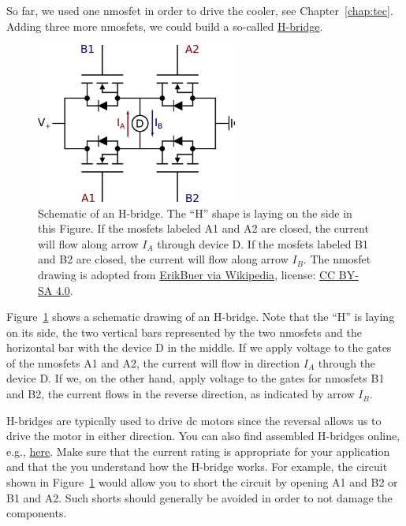 So far, we used one n\ac{mosfet} in order to drive the cooler, see Chapter~\ref{chap:tec}. Adding three more n\acp{mosfet}, we could build a so-called \href{https://en.wikipedia.org/wiki/H-bridge}{H-bridge}. 
\begin{figure}[tb]
    \centering
    \includegraphics[width=250px]{graphics/06_further/h-bridge.png}
    \caption{Schematic of an H-bridge. The ``H'' shape is laying on the side in this Figure. If the \acp{mosfet} labeled A1 and A2 are closed, the current will flow along arrow $I_A$ through device D. If the \acp{mosfet} labeled B1 and B2 are closed, the current will flow along arrow $I_B$. The n\ac{mosfet} drawing is adopted from \href{https://en.wikipedia.org/wiki/Electronic_symbol\#/media/File:Enh_N_channel_Mosfet.svg}{ErikBuer via Wikipedia}, license: \href{https://creativecommons.org/licenses/by-sa/4.0/}{CC BY-SA 4.0}.}
    \label{fig:outlook:h-bridge}
\end{figure}
Figure~\ref{fig:outlook:h-bridge} shows a schematic drawing of an H-bridge. Note that the 
``H'' is laying on its side, the two vertical bars represented by the two n\acp{mosfet} and the horizontal bar with the device D in the middle. If we apply voltage to the gates of the n\acp{mosfet} A1 and A2, the current will flow in direction $I_A$ through the device D. If we, on the other hand, apply voltage to the gates for n\acp{mosfet} B1 and B2, the current flows in the reverse direction, as indicated by arrow $I_B$. 

H-bridges are typically used to drive \ac{dc} motors since the reversal allows us to drive the motor in either direction. You can also find assembled H-bridges online, e.g., \href{https://www.electronics-lab.com/project/5-amp-h-bridge-dc-motor-driver-using-mc33886/}{here}. Make sure that the current rating is appropriate for your application and that the you understand how the H-bridge works. For example, the circuit shown in Figure~\ref{fig:outlook:h-bridge} would allow you to short the circuit by opening A1 and B2 or B1 and A2. Such shorts should generally be avoided in order to not damage the components.

